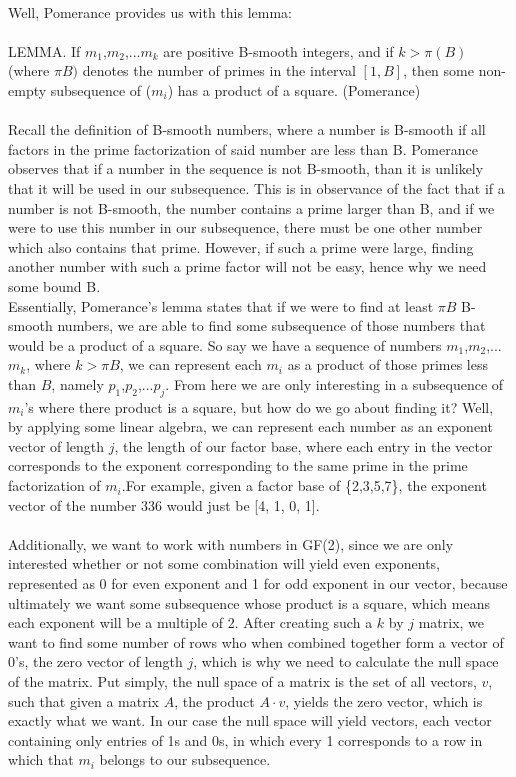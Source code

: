 \documentclass[12pt]{article} %
\begin{document}
\\Well, Pomerance provides us with this lemma:
\\\\LEMMA. If $m_1$,$m_2$,...$m_k$ are positive B-smooth integers, and if $k > \pi(B)$ (where $\pi{B})$ denotes the number of primes in the interval $[1, B]$, then some non-empty subsequence of ($m_i$) has a product of a square. (Pomerance)
\\\\Recall the definition of B-smooth numbers, where a number is B-smooth if all factors in the prime factorization of said number are less than B. Pomerance observes that if a number in the sequence is not B-smooth, than it is unlikely that it will be used in our subsequence. This is in observance of the fact that if a number is not B-smooth, the number contains a prime larger than B, and if we were to use this number in our subsequence, there must be one other number which also contains that prime. However, if such a prime were large, finding another number with such a prime factor will not be easy, hence why we need some bound B. 
\\Essentially, Pomerance’s lemma states that if we were to find at least $\pi{B}$ B-smooth numbers, we are able to find some subsequence of those numbers that would be a product of a square. So say we have a sequence of numbers $m_1$,$m_2$,...$m_k$, where $k>\pi{B}$, we can represent each $m_i$ as a product of those primes less than $B$, namely $p_1$,$p_2$,...$p_j$. From here we are only interesting in a subsequence of $m_i$’s where there product is a square, but how do we go about finding it? Well, by applying some linear algebra, we can represent each number as an exponent vector of length $j$, the length of our factor base, where each entry in the vector corresponds to the exponent corresponding to the same prime in the prime factorization of $m_i$.For example, given a factor base of \{2,3,5,7\}, the exponent vector of the number 336 would just be [4, 1, 0, 1]. 
\\\\ Additionally, we want to work with numbers in GF(2), since we are only interested whether or not some combination will yield even exponents, represented as 0 for even exponent and 1 for odd exponent in our vector, because ultimately we want some subsequence whose product is a square, which means each exponent will be a multiple of 2. After creating such a $k$ by $j$ matrix, we want to find some number of rows who when combined together form a vector of 0's, the zero vector of length $j$, which is why we need to calculate the null space of the matrix. Put simply, the null space of a matrix is the set of all vectors, $v$, such that given a matrix $A$, the product $A\cdot v$, yields the zero vector, which is exactly what we want. In our case the null space will yield vectors, each vector containing only entries of 1s and 0s, in which every 1 corresponds to a row in which that $m_i$ belongs to our subsequence. 
\end{document}
